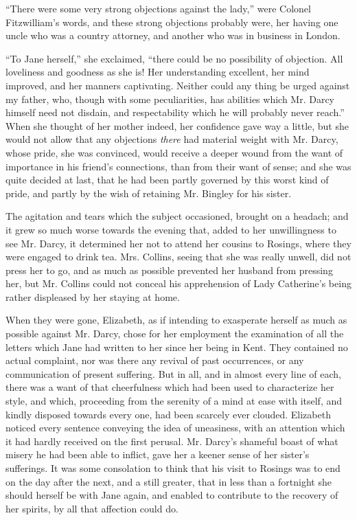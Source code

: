 “There were some very strong objections ag\-ainst the
lady,” were Colonel Fitzwilliam’s words, and these strong
objections probably were, her having one uncle who was
a country attorney, and another who was in business in
London.

“To Jane herself,” she exclaimed, “there could be no
possibility of objection. All loveliness and goodness as
she is! Her understanding excellent, her mind improved,
and her manners captivating. Neither could any thing
be urged against my father, who, though with some
peculiarities, has abilities which Mr. Darcy himself need
not disdain, and respectability which he will probably
never reach.” When she thought of her mother indeed,
her confidence gave way a little, but she would not allow
that any objections \textit{there} had material weight with
Mr. Darcy, whose pride, she was convinced, would receive
a deeper wound from the want of importance in his friend’s
connections, than from their want of sense; and she was
quite decided at last, that he had been partly governed
by this worst kind of pride, and partly by the wish of
retaining Mr. Bingley for his sister.

The agitation and tears which the subject occasioned,
brought on a headach; and it grew so much worse
towards the evening that, added to her unwillingness to
see Mr. Darcy, it determined her not to attend her cousins
to Rosings, where they were engaged to drink tea. Mrs.
Collins, seeing that she was really unwell, did not press
her to go, and as much as possible prevented her husband
from pressing her, but Mr. Collins could not conceal his
apprehension of Lady Catherine’s being rather displeased
by her staying at home.


When they were gone, Elizabeth, as if intending to
exasperate herself as much as possible against Mr. Darcy,
chose for her employment the examination of all the letters
which Jane had written to her since her being in Kent.
They contained no actual complaint, nor was there any
revival of past occurrences, or any communication of
present suffering. But in all, and in almost every line of
each, there was a want of that cheerfulness which had
been used to characterize her style, and which, proceeding
from the serenity of a mind at ease with itself, and kindly
disposed towards every one, had been scarcely ever clouded.
Elizabeth noticed every sentence conveying the idea of
uneasiness, with an attention which it had hardly received
on the first perusal. Mr. Darcy’s shameful boast of what
misery he had been able to inflict, gave her a keener sense
of her sister’s sufferings. It was some consolation to
think that his visit to Rosings was to end on the day after
the next, and a still greater, that in less than a fortnight
she should herself be with Jane again, and enabled to
contribute to the recovery of her spirits, by all that
affection could do.

